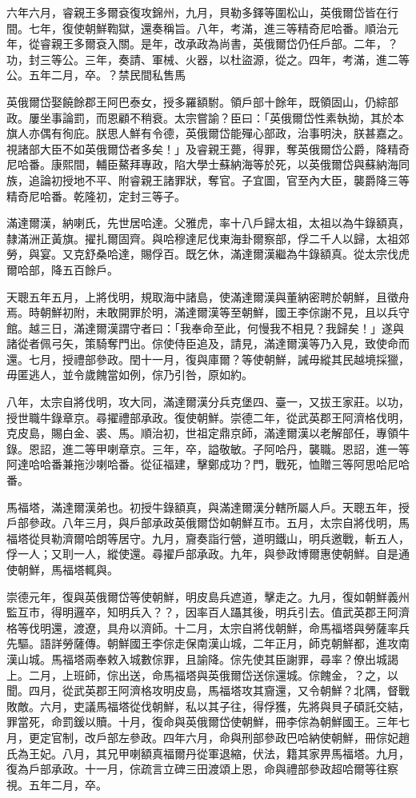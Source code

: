\begin{pinyinscope}
六年六月，睿親王多爾袞復攻錦州，九月，貝勒多鐸等圍松山，英俄爾岱皆在行間。七年，復使朝鮮鞫獄，還奏稱旨。八年，考滿，進三等精奇尼哈番。順治元年，從睿親王多爾袞入關。是年，改承政為尚書，英俄爾岱仍任戶部。二年，？功，封三等公。三年，奏請、軍械、火器，以杜盜源，從之。四年，考滿，進二等公。五年二月，卒。？禁民間私售馬

英俄爾岱娶饒餘郡王阿巴泰女，授多羅額駙。領戶部十餘年，既領固山，仍綜部政。屢坐事論罰，而恩顧不稍衰。太宗嘗諭？臣曰：「英俄爾岱性素執拗，其於本旗人亦偶有徇庇。朕思人鮮有令德，英俄爾岱能殫心部政，治事明決，朕甚嘉之。視諸部大臣不如英俄爾岱者多矣！」及睿親王薨，得罪，奪英俄爾岱公爵，降精奇尼哈番。康熙間，輔臣鰲拜專政，陷大學士蘇納海等於死，以英俄爾岱與蘇納海同族，追論初授地不平、附睿親王諸罪狀，奪官。子宜圖，官至內大臣，襲爵降三等精奇尼哈番。乾隆初，定封三等子。

滿達爾漢，納喇氏，先世居哈達。父雅虎，率十八戶歸太祖，太祖以為牛錄額真，隸滿洲正黃旗。擢扎爾固齊。與哈穆達尼伐東海卦爾察部，俘二千人以歸，太祖郊勞，與宴。又克舒桑哈達，賜俘百。既乞休，滿達爾漢繼為牛錄額真。從太宗伐虎爾哈部，降五百餘戶。

天聰五年五月，上將伐明，規取海中諸島，使滿達爾漢與董納密聘於朝鮮，且徵舟焉。時朝鮮初附，未敢開罪於明，滿達爾漢等至朝鮮，國王李倧謝不見，且以兵守館。越三日，滿達爾漢謂守者曰：「我奉命至此，何慢我不相見？我歸矣！」遂與諸從者佩弓矢，策騎奪門出。倧使侍臣追及，請見，滿達爾漢等乃入見，致使命而還。七月，授禮部參政。閏十一月，復與庫爾？等使朝鮮，誡毋縱其民越境採獵，毋匿逃人，並令歲餽當如例，倧乃引咎，原如約。

八年，太宗自將伐明，攻大同，滿達爾漢分兵克堡四、臺一，又拔王家莊。以功，授世職牛錄章京。尋擢禮部承政。復使朝鮮。崇德二年，從武英郡王阿濟格伐明，克皮島，賜白金、裘、馬。順治初，世祖定鼎京師，滿達爾漢以老解部任，專領牛錄。恩詔，進二等甲喇章京。三年，卒，謚敬敏。子阿哈丹，襲職。恩詔，進一等阿達哈哈番兼拖沙喇哈番。從征福建，擊鄭成功？門，戰死，恤贈三等阿思哈尼哈番。

馬福塔，滿達爾漢弟也。初授牛錄額真，與滿達爾漢分轄所屬人戶。天聰五年，授戶部參政。八年三月，與戶部承政英俄爾岱如朝鮮互市。五月，太宗自將伐明，馬福塔從貝勒濟爾哈朗等居守。九月，齎奏詣行營，道明鐵山，明兵邀戰，斬五人，俘一人；又刵一人，縱使還。尋擢戶部承政。九年，與參政博爾惠使朝鮮。自是通使朝鮮，馬福塔輒與。

崇德元年，復與英俄爾岱等使朝鮮，明皮島兵遮道，擊走之。九月，復如朝鮮義州監互市，得明邏卒，知明兵入？？，因率百人躡其後，明兵引去。值武英郡王阿濟格等伐明還，渡遼，具舟以濟師。十二月，太宗自將伐朝鮮，命馬福塔與勞薩率兵先驅。語詳勞薩傳。朝鮮國王李倧走保南漢山城，二年正月，師克朝鮮都，進攻南漢山城。馬福塔兩奉敕入城數倧罪，且諭降。倧先使其臣謝罪，尋率？僚出城謁上。二月，上班師，倧出送，命馬福塔與英俄爾岱送倧還城。倧餽金，？之，以聞。四月，從武英郡王阿濟格攻明皮島，馬福塔攻其齎還，又令朝鮮？北隅，督戰敗敵。六月，吏議馬福塔從伐朝鮮，私以其子往，得俘獲，先將與貝子碩託交結，罪當死，命罰鍰以贖。十月，復命與英俄爾岱使朝鮮，冊李倧為朝鮮國王。三年七月，更定官制，改戶部左參政。四年六月，命與刑部參政巴哈納使朝鮮，冊倧妃趙氏為王妃。八月，其兄甲喇額真福爾丹從軍退縮，伏法，籍其家畀馬福塔。九月，復為戶部承政。十一月，倧疏言立碑三田渡頌上恩，命與禮部參政超哈爾等往察視。五年二月，卒。


\end{pinyinscope}
